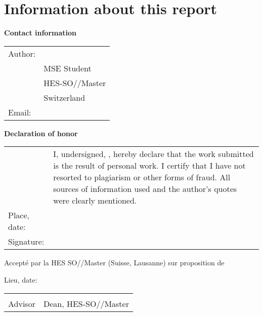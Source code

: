 \chapter*{Information about this report}

\vspace{\fill}

\textbf{Contact information}

\begin{tabularx}{\textwidth}{N{2.5cm}X}
	Author:	 & \AuthorFirstName \AuthorLastName \\
	& MSE Student \\
	& HES-SO//Master \\
	& Switzerland \\
	Email: & \email{\AuthorEmail}
\end{tabularx}

\vspace{\fill}

\textbf{Declaration of honor}

{\renewcommand{\arraystretch}{2}
\begin{tabularx}{\textwidth}{N{2.5cm}X}
	& I, undersigned, \Author, hereby declare that the work submitted is
	the result of personal work. I certify that I have not resorted to
	plagiarism or other forms of fraud. All sources of information used and the
	author's quotes were clearly mentioned. \\
	Place, date: & \underline{\hspace{7cm}} \\
	Signature: & \underline{\hspace{7cm}}
\end{tabularx}
}

\vspace{\fill}


Accepté par la HES SO//Master (Suisse, Lausanne) sur proposition de

\vspace{0.5cm}

\Advisor %


\vspace{1cm}

Lieu, date: \underline{\hspace{8cm}}

\vspace{3cm}

{ \renewcommand{\arraystretch}{1.5}
\begin{tabularx}{\textwidth}{X X}
	\Advisor  & \Dean\\
	Advisor   & Dean, HES-SO//Master\\
\end{tabularx}
}